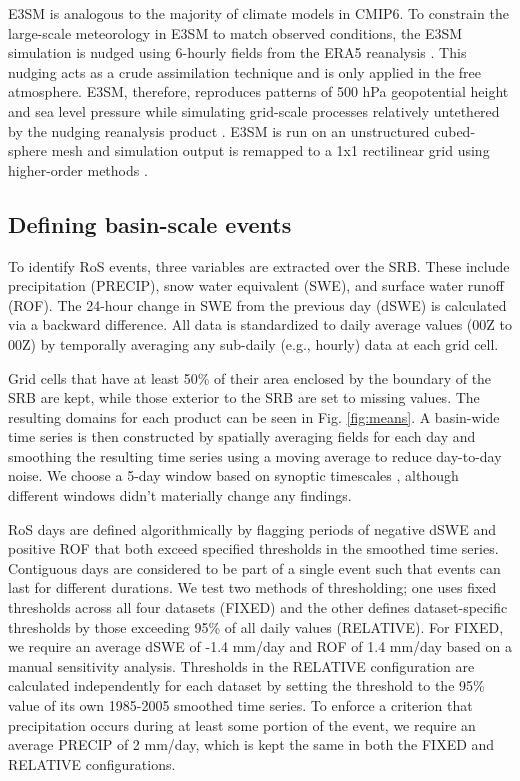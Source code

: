 \documentclass[nhess, manuscript]{copernicus}
\begin{document}
E3SM is analogous to the majority of climate models in CMIP6.
To constrain the large-scale meteorology in E3SM to match observed conditions, the E3SM simulation is nudged using 6-hourly fields from the ERA5 reanalysis \citep{hersbach2020era5}.
This nudging acts as a crude assimilation technique and is only applied in the free atmosphere.
E3SM, therefore, reproduces patterns of 500 hPa geopotential height and sea level pressure while simulating grid-scale processes relatively untethered by the nudging reanalysis product \citep{sun2019impact}.
E3SM is run on an unstructured cubed-sphere mesh and simulation output is remapped to a 1\degree{}x1\degree{} rectilinear grid using higher-order methods \citep{hill2004architecture}.

\subsection{Defining basin-scale events}

To identify RoS events, three variables are extracted over the SRB.
These include precipitation (PRECIP), snow water equivalent (SWE), and surface water runoff (ROF).
The 24-hour change in SWE from the previous day (dSWE) is calculated via a backward difference.
All data is standardized to daily average values (00Z to 00Z) by temporally averaging any sub-daily (e.g., hourly) data at each grid cell.

Grid cells that have at least 50\% of their area enclosed by the boundary of the SRB are kept, while those exterior to the SRB  are set to missing values.
The resulting domains for each product can be seen in Fig. \ref{fig:means}. A basin-wide time series is then constructed by spatially averaging fields for each day and smoothing the resulting time series using a moving average to reduce day-to-day noise.
We choose a 5-day window based on synoptic timescales \citep{holton2004introduction}, although different windows didn't materially change any findings.

RoS days are defined algorithmically by flagging periods of negative dSWE and positive ROF that both exceed specified thresholds in the smoothed time series.
Contiguous days are considered to be part of a single event such that events can last for different durations.
We test two methods of thresholding; one uses fixed thresholds across all four datasets (FIXED) and the other defines dataset-specific thresholds by those exceeding 95\% of all daily values (RELATIVE).
For FIXED, we require an average dSWE of -1.4 mm/day and ROF of 1.4 mm/day based on a manual sensitivity analysis.
Thresholds in the RELATIVE configuration are calculated independently for each dataset by setting the threshold to the 95\% value of its own 1985-2005 smoothed time series.
To enforce a criterion that precipitation occurs during at least some portion of the event, we require an average PRECIP of 2 mm/day, which is kept the same in both the FIXED and RELATIVE configurations.
\end{document}
